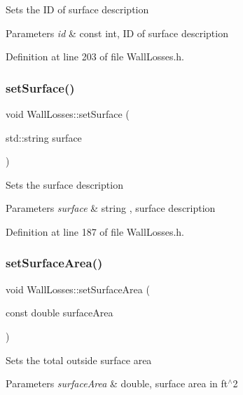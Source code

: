 Sets the ID of surface description 
\begin{DoxyParams}{Parameters}
{\em id} & const int, ID of surface description \\
\hline
\end{DoxyParams}


Definition at line 203 of file Wall\+Losses.\+h.

\mbox{\label{class_wall_losses_af329a27b78e1f2d84af6a48ffc59bfad}} 
\subsubsection{\texorpdfstring{set\+Surface()}{setSurface()}}
{\footnotesize\ttfamily void Wall\+Losses\+::set\+Surface (\begin{DoxyParamCaption}\item[{std\+::string}]{surface }\end{DoxyParamCaption})\hspace{0.3cm}{\ttfamily [inline]}}

Sets the surface description 
\begin{DoxyParams}{Parameters}
{\em surface} & string , surface description \\
\hline
\end{DoxyParams}


Definition at line 187 of file Wall\+Losses.\+h.

\mbox{\label{class_wall_losses_acbbbe4b1ec44bb04e5e1db944017995c}} 
\subsubsection{\texorpdfstring{set\+Surface\+Area()}{setSurfaceArea()}}
{\footnotesize\ttfamily void Wall\+Losses\+::set\+Surface\+Area (\begin{DoxyParamCaption}\item[{const double}]{surface\+Area }\end{DoxyParamCaption})\hspace{0.3cm}{\ttfamily [inline]}}

Sets the total outside surface area 
\begin{DoxyParams}{Parameters}
{\em surface\+Area} & double, surface area in ft$^\wedge$2 \\
\hline
\end{DoxyParams}


